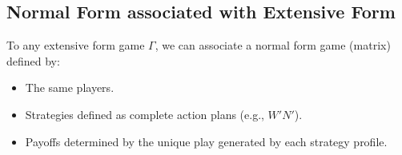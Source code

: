 \subsection{Normal Form associated with Extensive Form}
\begin{definition}
To any extensive form game $\Gamma$, we can associate a normal form game (matrix) defined by:
\begin{itemize}
    \item The same players.
    \item Strategies defined as complete action plans (e.g., $W'N'$).
    \item Payoffs determined by the unique play generated by each strategy profile.
\end{itemize}
\end{definition}

